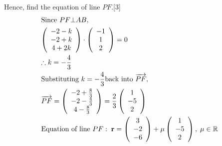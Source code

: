 \documentclass[12pt, a4 paper]{article}
\begin{document}
\begin{outline}[enumerate]
				\color{black}
				\2 Hence, find the equation of line $PF$.\hfill[3]
				\color{blue}
				\[\begin{gathered}
					{\text{Since }}PF \bot AB, \hfill \\
					\left( {\begin{array}{*{20}{c}}
						{ - 2 - k} \\ 
						{ - 2 + k} \\ 
						{4 + 2k} 
						\end{array}} \right) \cdot \left( {\begin{array}{*{20}{c}}
						{ - 1} \\ 
						1 \\ 
						2 
						\end{array}} \right) = 0 \hfill \\
					\therefore k =  - \frac{4}{3} \hfill \\
					{\text{Substituting }}k =  - \frac{4}{3}{\text{back into }}\overrightarrow {PF} , \hfill \\
					\overrightarrow {PF}  = \left( {\begin{array}{*{20}{c}}
						{ - 2 + \frac{8}{3}} \\ 
						{ - 2 - \frac{4}{3}} \\ 
						{4 - \frac{8}{3}} 
						\end{array}} \right) = \frac{2}{3}\left( {\begin{array}{*{20}{c}}
						1 \\ 
						{ - 5} \\ 
						2 
						\end{array}} \right) \hfill \\
					{\text{Equation of line }}PF:\;{\mathbf{r}} = \left( {\begin{array}{*{20}{c}}
						3 \\ 
						{ - 2} \\ 
						{ - 6} 
						\end{array}} \right) + \mu \left( {\begin{array}{*{20}{c}}
						1 \\ 
						{ - 5} \\ 
						2 
						\end{array}} \right),\;\mu  \in \mathbb{R} \hfill \\ 
					\end{gathered}\]
																															        

\end{outline}
\end{document}
